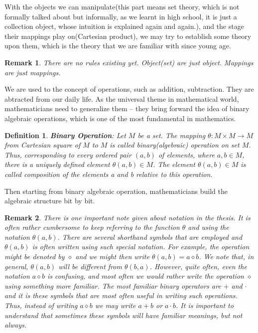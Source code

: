 \documentclass[a4paper]{book}
\newtheorem{definition}{Definition}[section]
\newtheorem{remark}{Remark}[section]
\begin{document}
    With the objects we can manipulate(this part means set theory,
    which is not formally talked about but informally, as we learnt in
    high school, it is just a collection object, whose intuition is
    explained again and again.), and the stage their mappings play
    on(Cartesian product), we may try to establish some theory upon
    them, which is the theory that we are familiar with since young
    age.

    \begin{remark}
      There are no rules existing yet. Object(set) are just object. Mappings
      are just mappings.
    \end{remark}

    We are used to the concept of operations, such as addition,
    subtraction.  They are abtracted from our daily life. As the
    universal theme in mathematical world, mathematicians need to
    generalize them -- they bring forward the idea of binary algebraic
    operations, which is one of the most fundamental in
    mathematics\cite{dixon2011algebra}.

    \begin{definition}
      \textbf{Binary Operation}: Let $M$ be a set. The mapping $\theta:
      M \times M \rightarrow M$ from Cartesian square of $M$ to $M$ is
      called binary(algebraic) operation on set $M$. Thus, corresponding
      to every ordered pair $(a,b)$ of elements, where $a,b \in M$, there
      is a uniquely defined element $\theta(a,b) \in M$. The element
      $\theta(a,b) \in M$ is called composition of the elements a and b
      relative to this operation.\cite{dixon2011algebra}
    \end{definition}

    Then starting from binary algebraic operation, mathematicians build the
    algebraic structure bit by bit.

    \begin{remark}
      There is one important note given about notation in the
      thesis\cite{dixon2011algebra}. It is often rather cumbersome to keep
      referring to the function $\theta$ and using the notation
      $\theta(a,b)$. There are several shorthand symbols that are employed
      and $\theta(a,b)$ is often written using such special notation. For
      example, the operation might be denoted by $\diamond$ and we might
      then write $\theta(a,b) = a \diamond b$. We note that, in general,
      $\theta(a,b)$ will be different from $\theta(b,a)$. However, quite
      often, even the notation $a \diamond b$ is confusing, and most often
      we would rather write the operation $\diamond$ using something more
      familiar. The most familiar binary operators are $+$  and $\cdot$ and
      it is these symbols that are most often useful in writing such
      operations. Thus, instead of writing $a \diamond b$ we may write $a +
      b$ or $ a \cdot b$. It is important to understand that sometimes
      these symbols will have familiar meanings, but not
      always.\cite{dixon2011algebra}
    \end{remark}
\end{document}
